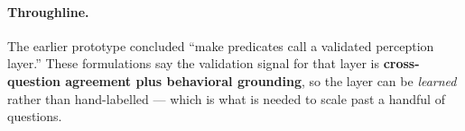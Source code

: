 \documentclass[11pt]{article}
\begin{document}
\paragraph{Throughline.} The earlier prototype concluded ``make predicates call a
validated perception layer.'' These formulations say the validation signal for
that layer is \textbf{cross-question agreement plus behavioral grounding}, so the
layer can be \emph{learned} rather than hand-labelled --- which is what is needed
to scale past a handful of questions.
\end{document}
